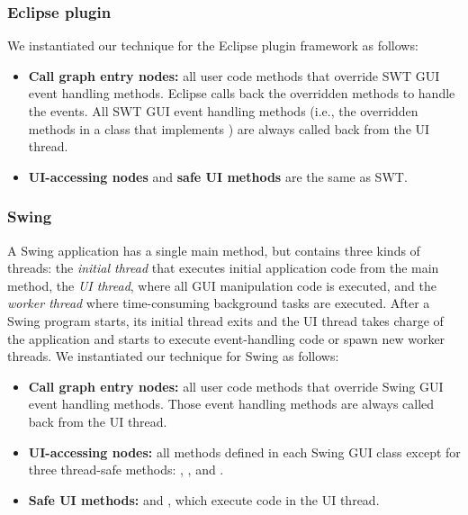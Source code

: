 \tinystep
\tinystep
\subsubsection{Eclipse plugin}

We instantiated our technique for the Eclipse plugin framework as follows:

\preitemizespace

\begin{itemize}

\item \textbf{Call graph entry nodes:}  all user code methods that override
 SWT GUI event handling methods. Eclipse
calls back the overridden methods to handle the
events. All SWT GUI event handling methods (i.e., the overridden
methods in a class that implements ) are
always called back from the UI thread.

\tinystep

\item \textbf{UI-accessing nodes} and \textbf{safe UI methods} are the same as SWT\@.

\end{itemize}

\tinystep
\tinystep
\tinystep
\subsubsection{Swing}

A Swing application has a single main method, but contains three kinds of
threads: the \textit{initial thread} that executes initial application code from the main method,
the \textit{UI thread}, where all GUI manipulation code is executed,
and the \textit{worker thread} where time-consuming background tasks are executed.
After a Swing program starts, its initial thread exits and the UI thread takes charge
of the application and starts to execute event-handling code or spawn new worker threads. 
We instantiated our technique for Swing as follows:

\preitemizespace

\begin{itemize}

\item \textbf{Call graph entry nodes:} all user code methods that override
Swing GUI event handling methods. Those event handling methods are always
called back from the UI thread.

\tinystep

\item \textbf{UI-accessing nodes:} %
all methods defined in each Swing GUI class except for three thread-safe
methods: , , and .

\tinystep

\item \textbf{Safe UI methods:}  
 and , which execute code in the UI thread.

\end{itemize}

